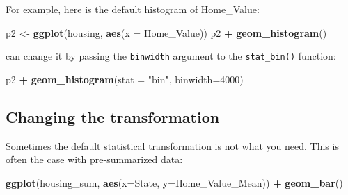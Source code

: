 \documentclass[]{book}
\newenvironment{Shaded}{\begin{snugshade}}{\end{snugshade}}
\newcommand{\KeywordTok}[1]{\textcolor[rgb]{0.13,0.29,0.53}{\textbf{#1}}}
\newcommand{\DataTypeTok}[1]{\textcolor[rgb]{0.13,0.29,0.53}{#1}}
\newcommand{\DecValTok}[1]{\textcolor[rgb]{0.00,0.00,0.81}{#1}}
\newcommand{\StringTok}[1]{\textcolor[rgb]{0.31,0.60,0.02}{#1}}
\newcommand{\OperatorTok}[1]{\textcolor[rgb]{0.81,0.36,0.00}{\textbf{#1}}}
\newcommand{\NormalTok}[1]{#1}
\begin{document}
For example, here is the default histogram of Home\_Value:

\begin{Shaded}
\begin{Highlighting}[]
\NormalTok{p2 <-}\StringTok{ }\KeywordTok{ggplot}\NormalTok{(housing, }\KeywordTok{aes}\NormalTok{(}\DataTypeTok{x =}\NormalTok{ Home_Value))}
\NormalTok{p2 }\OperatorTok{+}\StringTok{ }\KeywordTok{geom_histogram}\NormalTok{()}
\end{Highlighting}
\end{Shaded}

can change it by passing the \texttt{binwidth} argument to the
\texttt{stat\_bin()} function:

\begin{Shaded}
\begin{Highlighting}[]
\NormalTok{p2 }\OperatorTok{+}\StringTok{ }\KeywordTok{geom_histogram}\NormalTok{(}\DataTypeTok{stat =} \StringTok{"bin"}\NormalTok{, }\DataTypeTok{binwidth=}\DecValTok{4000}\NormalTok{)}
\end{Highlighting}
\end{Shaded}

\subsection{Changing the
transformation}\label{changing-the-transformation}

Sometimes the default statistical transformation is not what you need.
This is often the case with pre-summarized data:

\begin{Shaded}
\end{Shaded}

\begin{Shaded}
\begin{Highlighting}[]
\KeywordTok{ggplot}\NormalTok{(housing_sum, }\KeywordTok{aes}\NormalTok{(}\DataTypeTok{x=}\NormalTok{State, }\DataTypeTok{y=}\NormalTok{Home_Value_Mean)) }\OperatorTok{+}\StringTok{ }
\StringTok{  }\KeywordTok{geom_bar}\NormalTok{()}
\end{Highlighting}
\end{Shaded}
\end{document}
